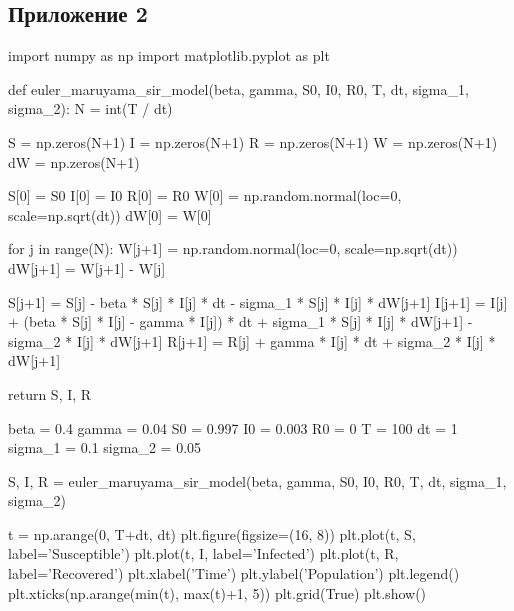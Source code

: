 \documentclass[a4paper, 12pt]{extarticle}
\numberwithin{equation}{section}
\begin{document}
	\subsection*{Приложение 2}
	\begin{python}
		import numpy as np
		import matplotlib.pyplot as plt
		
		def euler_maruyama_sir_model(beta, gamma, S0, I0, R0, T, dt, sigma_1, sigma_2):
		N = int(T / dt)
		
		S = np.zeros(N+1)
		I = np.zeros(N+1)
		R = np.zeros(N+1)
		W = np.zeros(N+1)
		dW = np.zeros(N+1)
		
		S[0] = S0
		I[0] = I0
		R[0] = R0
		W[0] = np.random.normal(loc=0, scale=np.sqrt(dt))
		dW[0] = W[0]
		
		for j in range(N):
		W[j+1] = np.random.normal(loc=0, scale=np.sqrt(dt))
		dW[j+1] = W[j+1] - W[j]
		
		S[j+1] = S[j] - beta * S[j] * I[j] * dt - sigma_1 * S[j] * I[j] * dW[j+1]
		I[j+1] = I[j] + (beta * S[j] * I[j] - gamma * I[j]) * dt + sigma_1 * S[j] * I[j] * dW[j+1] - sigma_2 * I[j] * dW[j+1]
		R[j+1] = R[j] + gamma * I[j] * dt + sigma_2 * I[j] * dW[j+1]
		
		return S, I, R
		
		beta = 0.4
		gamma = 0.04
		S0 = 0.997
		I0 = 0.003
		R0 = 0
		T = 100
		dt = 1
		sigma_1 = 0.1
		sigma_2 = 0.05
		
		S, I, R = euler_maruyama_sir_model(beta, 
		gamma, 
		S0, 
		I0, 
		R0, 
		T, 
		dt, 
		sigma_1,
		sigma_2)
		
		t = np.arange(0, T+dt, dt)
		plt.figure(figsize=(16, 8))
		plt.plot(t, S, label='Susceptible')
		plt.plot(t, I, label='Infected')
		plt.plot(t, R, label='Recovered')
		plt.xlabel('Time')
		plt.ylabel('Population')
		plt.legend()
		plt.xticks(np.arange(min(t), max(t)+1, 5))
		plt.grid(True)
		plt.show()
	\end{python}
\end{document}
